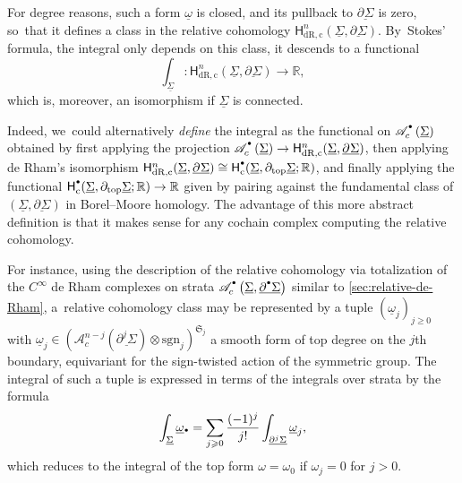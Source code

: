 \documentclass[10pt]{amsart}
\let\oldbullet\bullet
\renewcommand{\bullet}{{\raisebox{1pt}{$\scriptscriptstyle\oldbullet$}}}
\theoremstyle{definition}
\theoremstyle{remark}
\newcommand{\RR}{\mathbb{R}}
\renewcommand{\ge}{\geqslant}
\newcommand{\uomega}{\underline{\omega}}
\newcommand{\rbrac}[1]{\left(#1\right)}
\newcommand{\Ac}[2][\bullet]{\mathscr{A}_c^{#1}\rbrac{#2}}
\newcommand{\uSig}{\underline{\Sigma}}
\newcommand{\ubdSig}[1][]{\underline{\partial^{#1}\Sigma}}
\newcommand{\HdRc}[2][\bullet]{\mathsf{H}_{\mathrm{dR},\mathrm{c}}^{#1}(#2)}
\newcommand{\symgp}[1]{\mathfrak{S}_{#1}}
\newcommand{\sgn}[1]{\mathrm{sgn}_{#1}}
\begin{document}
For degree reasons, such a form $\uomega$ is closed, and its pullback to $\ubdSig$ is zero, so~that it defines a class in the relative cohomology $\HdRc[n]{\uSig,\ubdSig}$. By~Stokes' formula, the integral only depends on this class, \ie it descends to a functional
\[
\int_{\uSig} : \HdRc[n]{\uSig,\ubdSig} \to \RR,
\]
which is, moreover, an isomorphism if $\uSig$ is connected.

Indeed, we~could alternatively \emph{define} the integral as the functional on $\Ac{\uSig}$ obtained by first applying the projection $\Ac{\uSig} \to \HdRc[n]{\uSig,\ubdSig}$, then applying de Rham's isomorphism $\HdRc[n]{\uSig,\ubdSig}\cong \mathsf{H}^\bullet_\mathrm{c}(\uSig,\partial_{\mathrm{top}}\uSig;\RR)$, and finally applying the functional $\mathsf{H}^\bullet_\mathrm{c}(\uSig,\partial_{\mathrm{top}}\uSig;\RR) \to \RR$ given by pairing against the fundamental class of $(\uSig,\ubdSig)$ in Borel--Moore homology. The advantage of this more abstract definition is that it makes sense for any cochain complex computing the relative cohomology.

For instance, using the description of the relative cohomology via totalization of the $C^\infty$ de Rham complexes on strata $\Ac{\uSig,\ubdSig[\bullet]}$ similar to \autoref{sec:relative-de-Rham}, a~relative cohomology class may be represented by a tuple $(\uomega_j)_{j \ge0}$ with \hbox{$\uomega_j\!\in\! (\Ac[n-j]{\ubdSig[j]}\otimes\sgn{j})^{\symgp{j}}$} a smooth form of top degree on the $j$th boundary, equivariant for the sign-twisted action of the symmetric group. The integral of such a tuple is expressed in terms of the integrals over strata by the formula\vspace*{-3pt}
\[
\int_{\uSig}\uomega_\bullet= \sum_{j \ge 0} \frac{(-1)^j}{j!} \int_{\ubdSig[j]}\uomega_j,
\]
which reduces to the integral of the top form $\omega = \omega_0$ if $\omega_j = 0$ for $j>0$.
\end{document}
